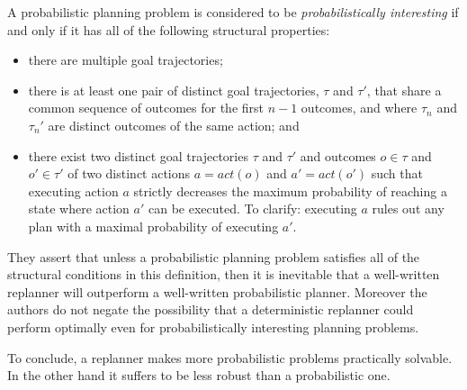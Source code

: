 \begin{displayquote}
A probabilistic planning problem is considered to be \textit{probabilistically interesting} if and only if it has all of the following structural properties:
\begin{itemize}
\item there are multiple goal trajectories;
\item there is at least one pair of distinct goal trajectories, $\tau$
and $\tau'$, that share a common sequence of outcomes for the
first $n-1$ outcomes, and where $\tau_n$ and $\tau_n'$ are distinct
outcomes of the same action; and
\item there exist two distinct goal trajectories $\tau$ and $\tau'$ and outcomes $o \in \tau$ and $o' \in \tau'$ of two distinct actions $a = act(o)$ and $a' = act(o')$  such that executing action $a$ strictly decreases
the maximum probability of reaching a state where action $a'$ can
be executed. To clarify: executing $a$ rules out any plan with a maximal probability of executing $a'$.
\end{itemize}
\end{displayquote}
They assert that unless a probabilistic planning problem satisfies all of the structural conditions in this definition, then
it is inevitable that a well-written replanner will outperform
a well-written probabilistic planner. Moreover the authors do not negate the possibility that a deterministic replanner could perform optimally even for probabilistically interesting planning problems. 

To conclude, a replanner makes more probabilistic problems practically solvable. In the other hand it suffers to be less robust than a probabilistic one. 

